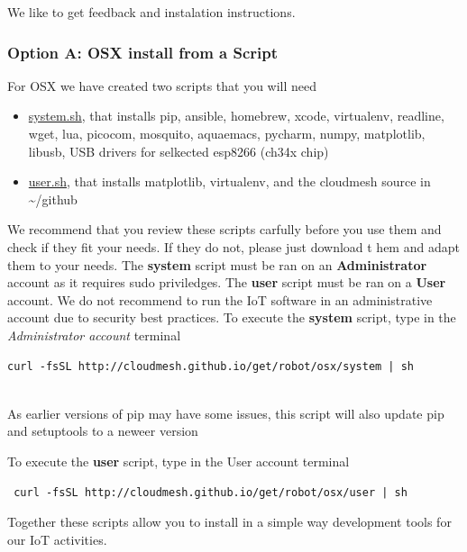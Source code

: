 We like to get feedback and instalation instructions.

\subsubsection{Option A: OSX install from a
Script}\label{option-a-osx-install-from-a-script}

For OSX we have created two scripts that you will need

\begin{itemize}
\item
  \href{http://cloudmesh.github.io/get/robot/osx/system/}{system.sh},
  that installs pip, ansible, homebrew, xcode, virtualenv, readline,
  wget, lua, picocom, mosquito, aquaemacs, pycharm, numpy, matplotlib,
  libusb, USB drivers for selkected esp8266 (ch34x chip)
\item
  \href{http://cloudmesh.github.io/get/robot/osx/user}{user.sh}, that
  installs matplotlib, virtualenv, and the cloudmesh source in
  \textasciitilde{}/github
\end{itemize}

We recommend that you review these scripts carfully before you use them
and check if they fit your needs. If they do not, please just download t
hem and adapt them to your needs. The \textbf{system} script must be ran
on an \textbf{Administrator} account as it requires sudo priviledges.
The \textbf{user} script must be ran on a \textbf{User} account. We do
not recommend to run the IoT software in an administrative account due
to security best practices. To execute the \textbf{system} script, type
in the \emph{Administrator account} terminal

\begin{verbatim}
curl -fsSL http://cloudmesh.github.io/get/robot/osx/system | sh
    
\end{verbatim}

As earlier versions of pip may have some issues, this script will also
update pip and setuptools to a neweer version

To execute the \textbf{user} script, type in the User account terminal

\begin{verbatim}
 curl -fsSL http://cloudmesh.github.io/get/robot/osx/user | sh
\end{verbatim}

Together these scripts allow you to install in a simple way development
tools for our IoT activities.

